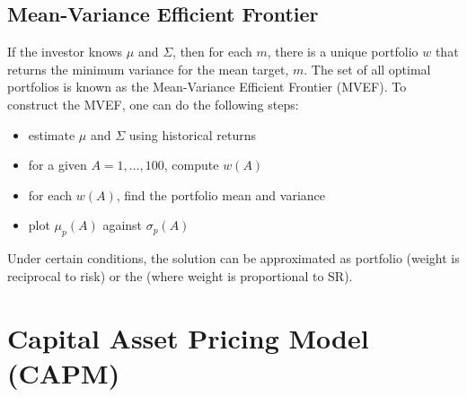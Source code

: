 \documentclass{article}
\begin{document}
\subsection{Mean-Variance Efficient Frontier}

If the investor knows $\mu$ and $\Sigma$, then for each $m$, there is a unique portfolio $w$ that returns the minimum variance for the mean target, $m$. The set of all optimal portfolios is known as the Mean-Variance Efficient Frontier (MVEF). To construct the MVEF, one can do the following steps: 
\begin{itemize}
  \item estimate $\mu$ and $\Sigma$ using historical returns 
  \item for a given $A = 1, \dots, 100$, compute $w(A)$ 
  \item for each $w(A)$, find the portfolio mean and variance 
  \item plot $\mu_p(A)$ against $\sigma_p(A)$
\end{itemize}

Under certain conditions, the solution can be approximated as  portfolio (weight is reciprocal to risk) or the  (where weight is proportional to SR). \\ 

\section{Capital Asset Pricing Model (CAPM)}
\end{document}
